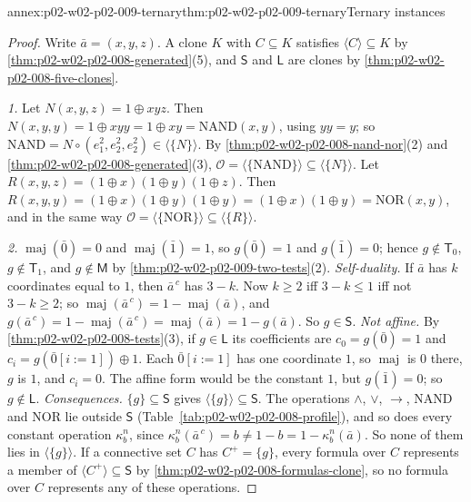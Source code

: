 \begin{annexitem}{annex:p02-w02-p02-009-ternary}{thm:p02-w02-p02-009-ternary}{Ternary instances}
\begin{proof}
Write \(\bar a=(x,y,z)\).  A clone \(K\) with \(C\subseteq K\) satisfies
\(\langle C\rangle\subseteq K\) by \cref{thm:p02-w02-p02-008-generated}(5),
and \(\mathsf S\) and \(\mathsf L\) are clones by
\cref{thm:p02-w02-p02-008-five-clones}.

\emph{1.}  Let \(N(x,y,z)=1\oplus xyz\).  Then
\(N(x,y,y)=1\oplus xyy=1\oplus xy=\mathrm{NAND}(x,y)\), using \(yy=y\); so
\(\mathrm{NAND}=N\circ(e^2_1,e^2_2,e^2_2)\in\langle\{N\}\rangle\).  By
\cref{thm:p02-w02-p02-008-nand-nor}(2) and
\cref{thm:p02-w02-p02-008-generated}(3),
\(\mathcal O=\langle\{\mathrm{NAND}\}\rangle\subseteq\langle\{N\}\rangle\).
Let \(R(x,y,z)=(1\oplus x)(1\oplus y)(1\oplus z)\).  Then
\(R(x,y,y)=(1\oplus x)(1\oplus y)(1\oplus y)=(1\oplus x)(1\oplus y)
=\mathrm{NOR}(x,y)\), and in the same way
\(\mathcal O=\langle\{\mathrm{NOR}\}\rangle\subseteq\langle\{R\}\rangle\).

\emph{2.}  \(\operatorname{maj}(\bar0)=0\) and \(\operatorname{maj}(\bar1)=1\),
so \(g(\bar0)=1\) and \(g(\bar1)=0\); hence \(g\notin\mathsf T_0\),
\(g\notin\mathsf T_1\), and \(g\notin\mathsf M\) by
\cref{thm:p02-w02-p02-009-two-tests}(2).
\emph{Self-duality.}  If \(\bar a\) has \(k\) coordinates equal to \(1\),
then \(\bar a^{\,c}\) has \(3-k\).  Now \(k\geq2\) iff \(3-k\leq1\) iff not
\(3-k\geq2\); so \(\operatorname{maj}(\bar a^{\,c})=1-\operatorname{maj}(\bar a)\),
and \(g(\bar a^{\,c})=1-\operatorname{maj}(\bar a^{\,c})
=\operatorname{maj}(\bar a)=1-g(\bar a)\).  So \(g\in\mathsf S\).
\emph{Not affine.}  By \cref{thm:p02-w02-p02-008-tests}(3), if
\(g\in\mathsf L\) its coefficients are \(c_0=g(\bar0)=1\) and
\(c_i=g(\bar0[i{:=}1])\oplus1\).  Each \(\bar0[i{:=}1]\) has one coordinate
\(1\), so \(\operatorname{maj}\) is \(0\) there, \(g\) is \(1\), and
\(c_i=0\).  The affine form would be the constant \(1\), but
\(g(\bar1)=0\); so \(g\notin\mathsf L\).
\emph{Consequences.}  \(\{g\}\subseteq\mathsf S\) gives
\(\langle\{g\}\rangle\subseteq\mathsf S\).  The operations \(\land\),
\(\lor\), \(\to\), \(\mathrm{NAND}\) and \(\mathrm{NOR}\) lie outside
\(\mathsf S\) (Table~\ref{tab:p02-w02-p02-008-profile}), and so does every
constant operation \(\kappa^n_b\), since
\(\kappa^n_b(\bar a^{\,c})=b\neq1-b=1-\kappa^n_b(\bar a)\).  So none of
them lies in \(\langle\{g\}\rangle\).  If a connective set \(C\) has
\(C^+=\{g\}\), every formula over \(C\) represents a member of
\(\langle C^+\rangle\subseteq\mathsf S\) by
\cref{thm:p02-w02-p02-008-formulas-clone}, so no formula over \(C\)
represents any of these operations.


\end{proof}
\end{annexitem}
